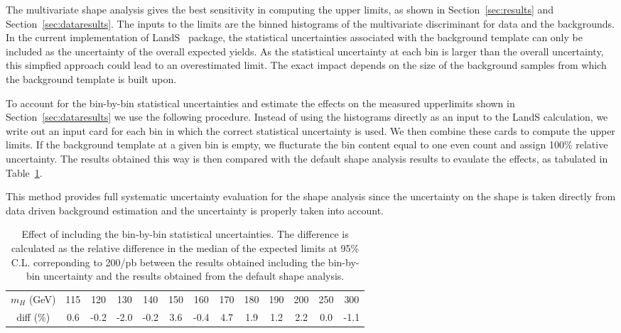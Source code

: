 The multivariate shape analysis gives the best sensitivity in computing the upper limits, 
as shown in Section~\ref{sec:results} and Section~\ref{sec:dataresults}. 
The inputs to the limits are the binned histograms of the multivariate discriminant for 
data and the backgrounds.  
In the current implementation of LandS~\cite{lands} package, 
the statistical uncertainties associated with the background template 
can only be included as the uncertainty of the overall expected yields.  
As the statistical uncertainty at each bin is larger than the overall uncertainty, 
this simpfied approach could lead to an overestimated limit. 
The exact impact depends on the size of the background samples from which 
the background template is built upon. 

To account for the bin-by-bin statistical uncertainties and estimate
the effects on the measured upperlimits shown in
Section~\ref{sec:dataresults} we use the following procedure. Instead
of using the histograms directly as an input to the LandS calculation,
we write out an input card for each bin in which the correct
statistical uncertainty is used. We then combine these cards to
compute the upper limits. If the background template at a given bin is
empty, we flucturate the bin content equal to one even count and
assign 100\% relative uncertainty.  The results obtained this way is
then compared with the default shape analysis results to evaulate the
effects, as tabulated in Table~\ref{tab:shapeuncertain}.

This method provides full systematic uncertainty evaluation for the
shape analysis since the uncertainty on the shape is taken directly
from data driven background estimation and the uncertainty is properly
taken into account.

\begin{table}
\begin{center}
\begin{tabular}{c c c c c c c c c c c c c}
\hline
 $m_H$ (GeV) & 115 & 120 & 130 & 140 & 150 & 160 & 170 & 180 & 190 & 200 & 250 & 300 \\
  diff (\%) & 0.6 & -0.2 & -2.0 & -0.2 & 3.6 & -0.4 & 4.7 & 1.9 & 1.2 & 2.2 & 0.0 & -1.1 \\
\hline
\end{tabular}
\end{center}
\caption{Effect of including the bin-by-bin statistical uncertainties. The difference is calculated as the 
relative difference in the median of the expected limits at 95\% C.L. correponding to 200/pb  
between the results obtained including the bin-by-bin uncertainty and the results obtained 
from the default shape analysis. }
\label{tab:shapeuncertain}
\end{table}




 
